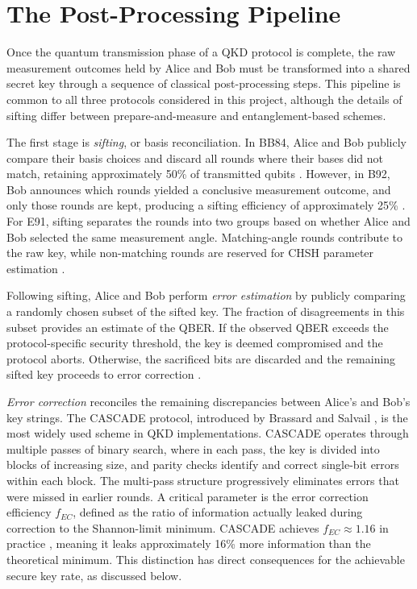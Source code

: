 \documentclass[10pt, a4paper]{report}
\begin{document}
\section{The Post-Processing Pipeline}
Once the quantum transmission phase of a QKD protocol is complete, the raw measurement outcomes held by Alice and Bob must be transformed into a shared secret key through a sequence of classical post-processing steps. This pipeline is common to all three protocols considered in this project, although the details of sifting differ between prepare-and-measure and entanglement-based schemes.

The first stage is \textit{sifting}, or basis reconciliation. In BB84, Alice and Bob publicly compare their basis choices and discard all rounds where their bases did not match, retaining approximately 50\% of transmitted qubits \cite{BB84}. However, in B92, Bob announces which rounds yielded a conclusive measurement outcome, and only those rounds are kept, producing a sifting efficiency of approximately 25\% \cite{B92}. For E91, sifting separates the rounds into two groups based on whether Alice and Bob selected the same measurement angle. Matching-angle rounds contribute to the raw key, while non-matching rounds are reserved for CHSH parameter estimation \cite{E91}.

Following sifting, Alice and Bob perform \textit{error estimation} by publicly comparing a randomly chosen subset of the sifted key. The fraction of disagreements in this subset provides an estimate of the QBER. If the observed QBER exceeds the protocol-specific security threshold, the key is deemed compromised and the protocol aborts. Otherwise, the sacrificed bits are discarded and the remaining sifted key proceeds to error correction \cite{Scarani2009}.

\textit{Error correction} reconciles the remaining discrepancies between Alice's and Bob's key strings. The CASCADE protocol, introduced by Brassard and Salvail \cite{Cascade1994}, is the most widely used scheme in QKD implementations. CASCADE operates through multiple passes of binary search, where in each pass, the key is divided into blocks of increasing size, and parity checks identify and correct single-bit errors within each block. The multi-pass structure progressively eliminates errors that were missed in earlier rounds. A critical parameter is the error correction efficiency $f_{EC}$, defined as the ratio of information actually leaked during correction to the Shannon-limit minimum. CASCADE achieves $f_{EC} \approx 1.16$ in practice \cite{Cascade1994}, meaning it leaks approximately 16\% more information than the theoretical minimum. This distinction has direct consequences for the achievable secure key rate, as discussed below.
\end{document}
